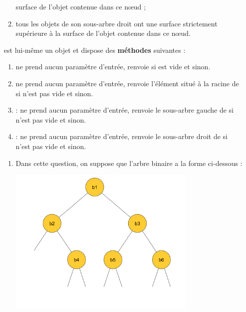 \documentclass[a4paper,12pt,french]{book}
\begin{document}
\begin{enumerate}[\bfseries 1.]
\begin{enumerate}[--]
            surface de l’objet contenue dans ce nœud ;
            \item 	tous les objets de son sous-arbre droit ont une surface strictement supérieure à la
            surface de l’objet contenue dans ce nœud.
        \end{enumerate}
         est lui-même un objet et dispose des \textbf{méthodes} suivantes :
        \begin{enumerate}[--]
            \item 	 {} ne prend aucun paramètre d'entrée, renvoie  si  est vide et  sinon.
            \item    {} ne prend aucun paramètre d'entrée, renvoie l’élément situé à la racine de  si  n’est pas vide et  sinon.
            \item    {} : ne prend aucun paramètre d'entrée, renvoie le sous-arbre gauche de  si  n’est pas vide et  sinon.
            \item    {} : ne prend aucun paramètre d'entrée, renvoie le sous-arbre droit de  si  n’est pas vide et  sinon.
         \end{enumerate}
         \begin{enumerate}[\bfseries a.]
             \item 	Dans cette question, on suppose que l'arbre binaire  a la forme ci-dessous :
                    \begin{center}
                        \includegraphics[width=9cm]{img/arbre.png}
                    \end{center}

\end{enumerate}
\end{enumerate}
\end{document}
